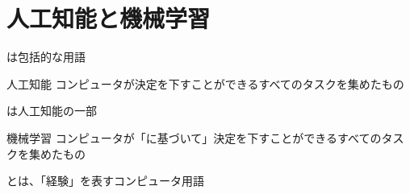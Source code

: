 \documentclass[../../../topic_machine-learning]{subfiles}
\begin{document}
\sectionline
\section{人工知能と機械学習}

は包括的な用語

\begin{definition}{人工知能}
  コンピュータが決定を下すことができるすべてのタスクを集めたもの
\end{definition}

は人工知能の一部

\begin{definition}{機械学習}
  コンピュータが「に基づいて」決定を下すことができるすべてのタスクを集めたもの
\end{definition}

とは、「経験」を表すコンピュータ用語
\end{document}
